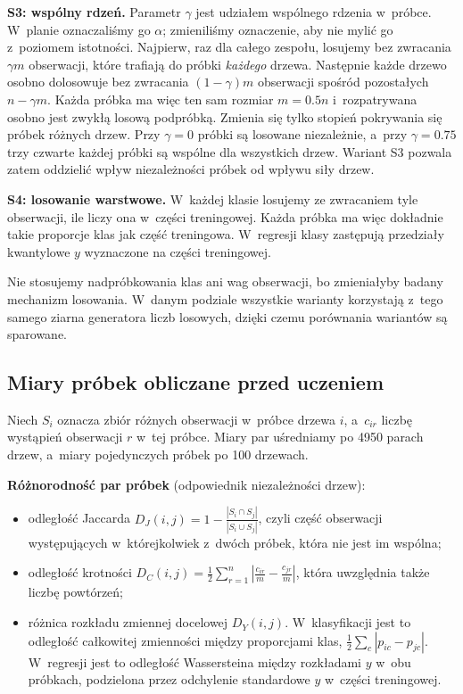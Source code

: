 \documentclass[11pt,a4paper]{article}
\begin{document}
\textbf{S3: wspólny rdzeń.} Parametr $\gamma$ jest udziałem wspólnego rdzenia w~próbce. W~planie oznaczaliśmy go $\alpha$; zmieniliśmy oznaczenie, aby nie mylić go z~poziomem istotności. Najpierw, raz dla całego zespołu, losujemy bez zwracania $\gamma m$ obserwacji, które trafiają do próbki \emph{każdego} drzewa. Następnie każde drzewo osobno dolosowuje bez zwracania $(1-\gamma)m$ obserwacji spośród pozostałych $n-\gamma m$. Każda próbka ma więc ten sam rozmiar $m=0.5n$ i~rozpatrywana osobno jest zwykłą losową podpróbką. Zmienia się tylko stopień pokrywania się próbek różnych drzew. Przy $\gamma=0$ próbki są losowane niezależnie, a~przy $\gamma=0.75$ trzy czwarte każdej próbki są wspólne dla wszystkich drzew. Wariant S3 pozwala zatem oddzielić wpływ niezależności próbek od wpływu siły drzew.

\textbf{S4: losowanie warstwowe.} W~każdej klasie losujemy ze zwracaniem tyle obserwacji, ile liczy ona w~części treningowej. Każda próbka ma więc dokładnie takie proporcje klas jak część treningowa. W~regresji klasy zastępują przedziały kwantylowe $y$ wyznaczone na części treningowej.

Nie stosujemy nadpróbkowania klas ani wag obserwacji, bo zmieniałyby badany mechanizm losowania. W~danym podziale wszystkie warianty korzystają z~tego samego ziarna generatora liczb losowych, dzięki czemu porównania wariantów są sparowane.

\subsection{Miary próbek obliczane przed uczeniem}
\label{sec:miary}

Niech $S_i$ oznacza zbiór różnych obserwacji w~próbce drzewa $i$, a~$c_{ir}$ liczbę wystąpień obserwacji $r$ w~tej próbce. Miary par uśredniamy po 4950 parach drzew, a~miary pojedynczych próbek po 100 drzewach.

\textbf{Różnorodność par próbek} (odpowiednik niezależności drzew):
\begin{itemize}
  \item odległość Jaccarda $D_J(i,j)=1-\frac{|S_i\cap S_j|}{|S_i\cup S_j|}$, czyli część obserwacji występujących w~którejkolwiek z~dwóch próbek, która nie jest im wspólna;
  \item odległość krotności $D_C(i,j)=\frac12\sum_{r=1}^{n}\left|\frac{c_{ir}}{m}-\frac{c_{jr}}{m}\right|$, która uwzględnia także liczbę powtórzeń;
  \item różnica rozkładu zmiennej docelowej $D_Y(i,j)$. W~klasyfikacji jest to odległość całkowitej zmienności między proporcjami klas, $\frac12\sum_c|p_{ic}-p_{jc}|$. W~regresji jest to odległość Wassersteina między rozkładami $y$ w~obu próbkach, podzielona przez odchylenie standardowe $y$ w~części treningowej.
\end{itemize}
\end{document}
